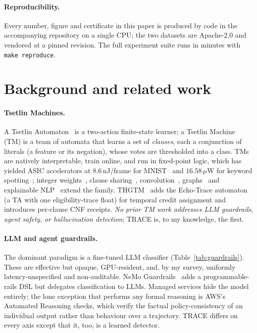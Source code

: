 \documentclass[11pt]{article}
\begin{document}
\paragraph{Reproducibility.} Every number, figure and certificate in this paper
is produced by code in the accompanying repository on a single CPU; the two
datasets are Apache-2.0 and vendored at a pinned revision. The full experiment
suite runs in minutes with \texttt{make reproduce}.

\section{Background and related work}
\label{sec:related}

\paragraph{Tsetlin Machines.} A Tsetlin Automaton~\citep{granmo2018tsetlin} is a
two-action finite-state learner; a Tsetlin Machine (TM) is a team of automata
that learns a set of \emph{clauses}, each a conjunction of literals (a feature
or its negation), whose votes are thresholded into a class. TMs are natively
interpretable, train online, and run in fixed-point logic, which has yielded
ASIC accelerators at $8.6$\,nJ/frame for MNIST~\citep{tunheim2025asic} and
$16.58\,\mu$W for keyword spotting~\citep{lin2025tsetlinkws,lei2021kws}; integer
weights~\citep{abeyrathna2020integer}, clause sharing~\citep{glimsdal2021coalesced},
convolution~\citep{granmo2019convolutional}, graphs~\citep{granmo2025graph} and
explainable NLP~\citep{bhattarai2020novelty,bhattarai2021fakenews} extend the
family. THGTM~\citep{debes2026thgtm} adds the Echo-Trace automaton (a TA with
one eligibility-trace float) for temporal credit assignment and introduces
per-clause CNF receipts. \emph{No prior TM work addresses LLM guardrails, agent
safety, or hallucination detection}; TRACE is, to my knowledge, the first.

\paragraph{LLM and agent guardrails.} The dominant paradigm is a fine-tuned LLM
classifier (Table~\ref{tab:guardrails}). These are effective but opaque,
GPU-resident, and, by my survey, uniformly latency-unspecified and
non-auditable. NeMo Guardrails~\citep{rebedea2023nemo} adds a programmable-rails
DSL but delegates classification to LLMs. Managed services
\citep{azurepromptshields,awsbedrockguardrails} hide the model entirely; the lone
exception that performs any formal reasoning is AWS's Automated Reasoning checks,
which verify the factual policy-consistency of an individual output rather than
behaviour over a trajectory. TRACE differs on every axis except that it, too, is
a learned detector.
\end{document}
